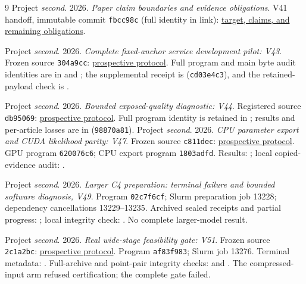 \documentclass[10pt,twocolumn,letterpaper]{article}
\begin{document}
\begin{thebibliography}{9}
Project \emph{second}. 2026. \emph{Paper claim boundaries and evidence obligations}.
V41 handoff, immutable commit
\texttt{fbcc98c} (full identity in link):
\href{https://github.com/priyankjairaj100/second/blob/fbcc98c6559de4b88ffc9c8b960cf680d89e29d3/docs/CLAIM_BOUNDARIES_V41.md}{target, claims, and remaining obligations}.

Project \emph{second}. 2026. \emph{Complete fixed-anchor service development
pilot: V43}. Frozen source \texttt{304a9cc}:
\href{https://github.com/priyankjairaj100/second/blob/304a9cc73b3c263032f3ef6a02487b4d2df40fbe/research_v43/PROTOCOL.txt}{prospective protocol}.
Full program and main byte audit identities are in
 and
;
the supplemental receipt is
(\texttt{cd03e4c3}), and the retained-payload check is
.

Project \emph{second}. 2026. \emph{Bounded exposed-quality diagnostic: V44}.
Registered source \texttt{db95069}:
\href{https://github.com/priyankjairaj100/second/blob/db95069b2c3484ac615052fb1c1a711c8c773c2d/research_v44/PROTOCOL.txt}{prospective protocol}.
Full program identity is retained in
; results and
per-article losses are in
(\texttt{98870a81}).
Project \emph{second}. 2026. \emph{CPU parameter export and CUDA likelihood parity: V47}.
Frozen source \texttt{c811dec}:
\href{https://github.com/priyankjairaj100/second/blob/c811dec/research_v47/PROTOCOL.txt}{prospective protocol}.
GPU program \texttt{620076c6}; CPU export program \texttt{1803adfd}.
Results: ;
local copied-evidence audit: .

Project \emph{second}. 2026. \emph{Larger C4 preparation: terminal failure and
bounded software diagnosis, V49}.
Program \texttt{02c7f6cf}; Slurm preparation job 13228; dependency cancellations
13229--13235. Archived sealed receipts and partial progress:
; local integrity check:
. No complete larger-model result.

Project \emph{second}. 2026. \emph{Real wide-stage feasibility gate: V51}.
Frozen source \texttt{2c1a2bc}:
\href{https://github.com/priyankjairaj100/second/blob/2c1a2bc699e4633bdab7243bb9e042be2f884c83/research_v51/PROTOCOL.txt}{prospective protocol}.
Program \texttt{af83f983}; Slurm job 13276.
Terminal metadata: .
Full-archive and point-pair integrity checks:
 and
.
The compressed-input arm refused certification; the complete gate failed.


\end{thebibliography}
\end{document}
